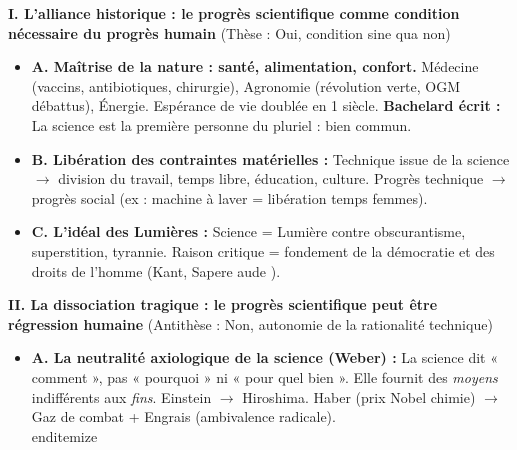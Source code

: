 \documentclass[11pt]{article}
\begin{document}
\begin{exoresolu}
    \textbf{I. L'alliance historique : le progrès scientifique comme condition nécessaire du progrès humain} (Thèse : Oui, condition sine qua non)
    \begin{itemize}
        \item \textbf{A. Maîtrise de la nature : santé, alimentation, confort.} Médecine (vaccins, antibiotiques, chirurgie), Agronomie (révolution verte, OGM débattus), Énergie. Espérance de vie doublée en 1 siècle. \textbf{Bachelard écrit :} \guillemotleft La science est la première personne du pluriel \guillemotright : bien commun.
        \item \textbf{B. Libération des contraintes matérielles :} Technique issue de la science $\rightarrow$ division du travail, temps libre, éducation, culture. Progrès technique $\rightarrow$ progrès social (ex : machine à laver = libération temps femmes).
        \item \textbf{C. L'idéal des Lumières :} Science = Lumière contre obscurantisme, superstition, tyrannie. Raison critique = fondement de la démocratie et des droits de l'homme (Kant, \guillemotleft Sapere aude \guillemotright).
    \end{itemize}

    \textbf{II. La dissociation tragique : le progrès scientifique peut être régression humaine} (Antithèse : Non, autonomie de la rationalité technique)
    \begin{itemize}
        \item \textbf{A. La neutralité axiologique de la science (Weber) :} La science dit « comment », pas « pourquoi » ni « pour quel bien ». Elle fournit des \emph{moyens} indifférents aux \emph{fins}. Einstein $\rightarrow$ Hiroshima. Haber (prix Nobel chimie) $\rightarrow$ Gaz de combat + Engrais (ambivalence radicale).
        \\end{itemize}
    \end{itemize}


\end{exoresolu}
\end{document}
